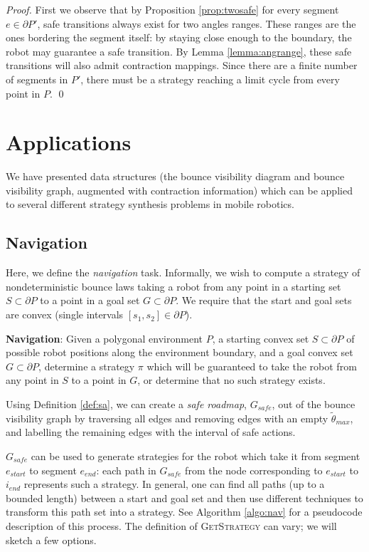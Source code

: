 \documentclass[]{styles/svproc}  %
\begin{document}
\begin{proof}
First we observe that by Proposition \ref{prop:twosafe} for every segment $e
\in \partial P'$, 
safe transitions always exist
for two angles ranges. These ranges are the ones bordering the segment itself:
by staying close enough to the boundary, the robot may guarantee a safe
transition. By Lemma \ref{lemma:angrange}, these safe transitions will also
admit contraction mappings. Since there are a finite number of segments in $P'$, there must be a strategy reaching
a limit cycle from every point in $P$. \qed
\end{proof}

\section{Applications}

We have presented data structures (the bounce visibility diagram and bounce
visibility graph, augmented with contraction information) which can be applied
to several different strategy synthesis problems in mobile robotics.

\subsection{Navigation}

Here, we define the \emph{navigation} task. Informally, we wish to compute a strategy 
of nondeterministic bounce laws taking a robot
from any point in a starting set $S \subset \partial P$ to a point in a goal set
$G \subset \partial P$. We require that the start and goal sets are
convex (single intervals $[s_1, s_2] \in \partial P$).

\begin{definition}
\textbf{Navigation}:
Given a polygonal environment $P$, a starting convex set $S \subset \partial P$ of possible robot positions along the
environment boundary, and a goal convex set $G \subset \partial P$, determine a strategy $\pi$ which
will be guaranteed to take the robot from any point in $S$ to a point in $G$, or
determine that no such strategy exists.
\end{definition}

Using Definition \ref{def:sa}, we can create a \emph{safe roadmap}, $G_{safe}$,
out of the 
bounce visibility graph by traversing all edges and removing edges with an 
empty $\tilde{\theta}_{max}$, and labelling the remaining edges with the interval 
of safe actions.

$G_{safe}$ can be used to generate strategies for the
robot which take it from segment $e_{start}$ to segment $e_{end}$: each path in
$G_{safe}$ from the node corresponding to $e_{start}$ to $i_{end}$ represents
such a strategy. In general, one can find all paths (up to a bounded length)
between a start and goal set and then use different techniques to transform this
path set into a strategy. See Algorithm \ref{algo:nav} for a pseudocode
description of this process. The definition of \textsc{GetStrategy} can vary;
we will sketch a few options.
\end{document}
